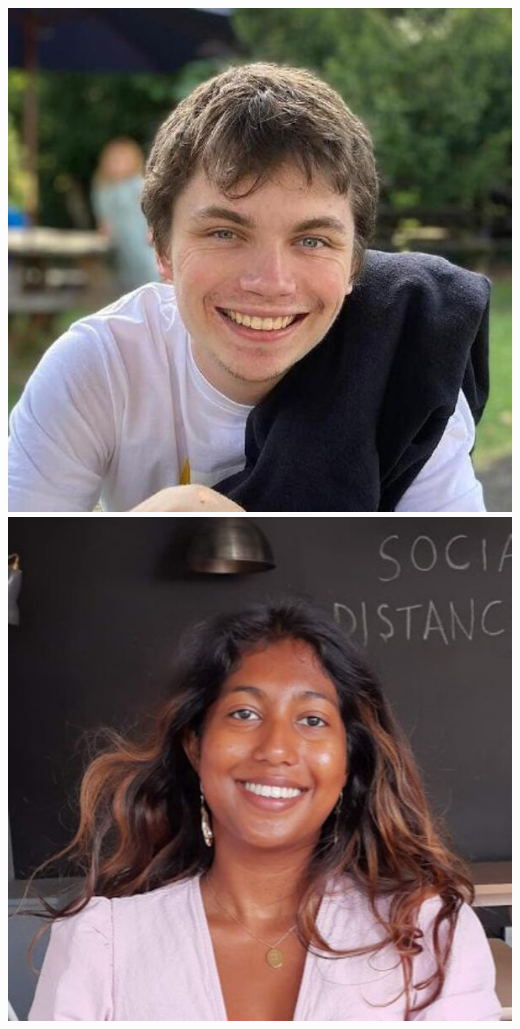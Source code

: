 \documentclass[aspectratio=169]{beamer}
\begin{document}
\begin{frame}
{        \includegraphics[width=0.06\textheight]{people/harry_bevins.jpg}%
        \includegraphics[width=0.06\textheight]{people/metha_prathaban.jpg}%
}
\end{frame}
\end{document}
